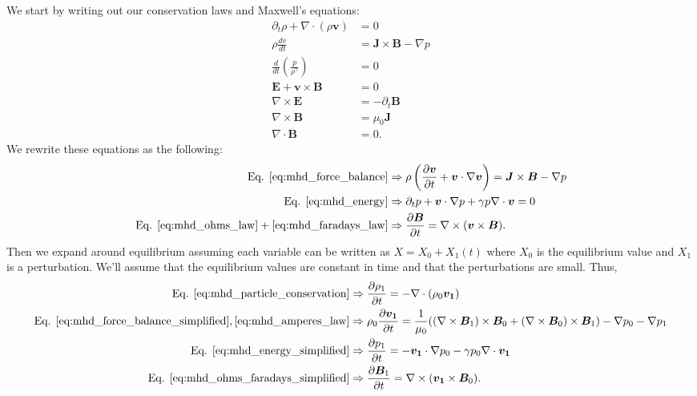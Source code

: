 We start by writing out our conservation laws and Maxwell's equations:
\begin{align}
  \partial_t \rho + \nabla \cdot (\rho \bm{v}) &= 0 \label{eq:mhd_particle_conservation}\\
  \rho \frac{dv}{dt} &= \bm{J} \times \bm{B} - \nabla p \label{eq:mhd_force_balance}\\
  \frac{d}{dt} \left(\frac{p}{\rho^\gamma}\right) &= 0 \label{eq:mhd_energy}\\
  \bm{E} + \bm{v} \times \bm{B} &= 0 \label{eq:mhd_ohms_law}\\
  \nabla \times \bm{E} &= -\partial_t \bm{B} \label{eq:mhd_faradays_law}\\
  \nabla \times \bm{B} &= \mu_0 \bm{J} \label{eq:mhd_amperes_law}\\
  \nabla \cdot \bm{B} &= 0 \label{eq:mhd_div_b}.
\end{align}
We rewrite these equations as the following:
\begin{align}
  \textrm{Eq. }\ref{eq:mhd_force_balance} &\Rightarrow \rho \left( \frac{\partial \bm{v}}{\partial t} + \bm{v} \cdot \nabla \bm{v} \right) = \bm{J} \times \bm{B} - \nabla p \label{eq:mhd_force_balance_simplified}\\
  \textrm{Eq. }\ref{eq:mhd_energy} &\Rightarrow \partial_t p + \bm{v} \cdot \nabla p + \gamma p \nabla \cdot \bm{v} = 0 \label{eq:mhd_energy_simplified}\\
  \textrm{Eq. }\ref{eq:mhd_ohms_law} + \ref{eq:mhd_faradays_law} &\Rightarrow \frac{\partial \bm{B}}{\partial t} = \nabla \times (\bm{v} \times \bm{B}) \label{eq:mhd_ohms_faradays_simplified}.
\end{align}
Then we expand around equilibrium assuming each variable can be written as $X = X_0 + X_1(t)$ where $X_0$ is the equilibrium value and $X_1$ is a perturbation. We'll assume that the equilibrium values are constant in time and that the perturbations are small. Thus,
\begin{align}
    \textrm{Eq. } \ref{eq:mhd_particle_conservation} &\Rightarrow \frac{\partial \rho_1}{\partial t} = - \nabla \cdot (\rho_0 \bm{v_1}) \label{eq:mhd_particle_linear}\\
    \textrm{Eq. } \ref{eq:mhd_force_balance_simplified}, \ref{eq:mhd_amperes_law} &\Rightarrow \rho_0 \frac{\partial \bm{v_1}}{\partial t} = \frac{1}{\mu_0} ((\nabla \times \bm{B}_1) \times \bm{B}_0 + (\nabla \times \bm{B}_0) \times \bm{B}_1) - \nabla p_0 - \nabla p_1 \label{eq:mhd_force_balance_linear}\\
    \textrm{Eq. } \ref{eq:mhd_energy_simplified} &\Rightarrow \frac{\partial p_1}{\partial t} = -\bm{v_1} \cdot \nabla p_0 -\gamma p_0 \nabla \cdot \bm{v_1} \label{eq:mhd_energy_linear}\\
    \textrm{Eq. } \ref{eq:mhd_ohms_faradays_simplified} &\Rightarrow \frac{\partial \bm{B}_1}{\partial t} = \nabla \times (\bm{v_1} \times \bm{B}_0) \label{eq:mhd_ohms_faradays_linear}.
\end{align}
